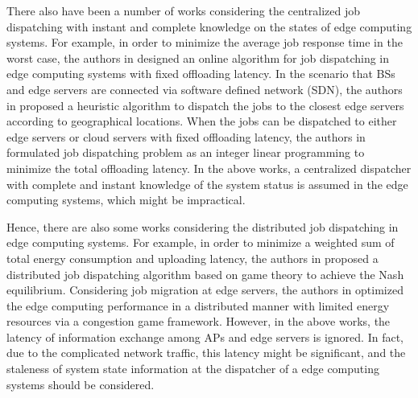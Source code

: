 There also have been a number of works considering the centralized job dispatching with instant and complete knowledge on the states of edge computing systems. For example, in order to minimize the average job response time in the worst case, the authors in \cite{tan-online} designed an online algorithm for job dispatching in edge computing systems with fixed offloading latency. In the scenario that BSs and edge servers are connected via software defined network (SDN), the authors in \cite{IOTJ18-FanQ} proposed a heuristic algorithm to dispatch the jobs to the closest edge servers according to geographical locations. When the jobs can be dispatched to either edge servers or cloud servers with fixed offloading latency, the authors in \cite{MASS18-MengZ} formulated job dispatching problem as an integer linear programming to minimize the total offloading latency.
In the above works, a centralized dispatcher with complete and instant knowledge of the system status is assumed in the edge computing systems, which might be impractical.

Hence, there are also some works considering the distributed job dispatching in edge computing systems. For example, in order to minimize a weighted sum of total energy consumption and uploading latency, the authors in \cite{ToN-Xuchen2016} proposed a distributed job dispatching algorithm based on game theory to achieve the Nash equilibrium. 
Considering job migration at edge servers, the authors in \cite{ToN-xujie2018} optimized the edge computing performance in a distributed manner with limited energy resources via a congestion game framework.
However, in the above works, the latency of information exchange among APs and edge servers is ignored.
In fact, due to the complicated network traffic, this latency might be significant, and the staleness of system state information at the dispatcher of a edge computing systems should be considered.


